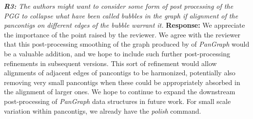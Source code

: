 \documentclass[aps,rmp,onecolumn]{revtex4-1}
\newcommand{\Marco}[1]{{\color{orange}Marco: #1}}
\newcommand{\reviewer}[2]{{\it \textbf{#1:} #2\vskip 5mm}}
\newcommand{\response}[1]{{{\color{response}\textbf{Response:} #1}}\vskip 5mm}
\begin{document}
\reviewer{R3}{The authors might want to consider some form of post processing of the PGG to collapse what have been called bubbles in the graph if alignment of the pancontigs on different edges of the bubble warrant it.}
\response{
      We appreciate the importance of the point raised by the reviewer.
      We agree with the reviewer that this post-processing smoothing of the graph produced by of \textit{PanGraph} would be a valuable addition, and we hope to include such further post-processing refinements in subsequent versions. 
      This sort of refinement would allow alignments of adjacent edges of pancontigs to be harmonized, potentially also removing very small pancontigs when these could be appropriately absorbed in the alignment of larger ones. We hope to continue to expand the downstream post-processing of \textit{PanGraph} data structures in future work. 
      For small scale variation within pancontigs, we already have the {\it polish} command. 
}
\end{document}
